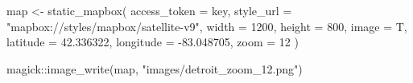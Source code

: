 \documentclass[
  letterpaper,
  DIV=11,
  numbers=noendperiod]{scrreprt}
\newenvironment{Shaded}{\begin{snugshade}}{\end{snugshade}}
\newcommand{\AttributeTok}[1]{\textcolor[rgb]{0.40,0.45,0.13}{#1}}
\newcommand{\DecValTok}[1]{\textcolor[rgb]{0.68,0.00,0.00}{#1}}
\newcommand{\FloatTok}[1]{\textcolor[rgb]{0.68,0.00,0.00}{#1}}
\newcommand{\FunctionTok}[1]{\textcolor[rgb]{0.28,0.35,0.67}{#1}}
\newcommand{\NormalTok}[1]{\textcolor[rgb]{0.00,0.23,0.31}{#1}}
\newcommand{\OtherTok}[1]{\textcolor[rgb]{0.00,0.23,0.31}{#1}}
\newcommand{\SpecialCharTok}[1]{\textcolor[rgb]{0.37,0.37,0.37}{#1}}
\newcommand{\StringTok}[1]{\textcolor[rgb]{0.13,0.47,0.30}{#1}}
\begin{document}
\begin{Shaded}
\begin{Highlighting}[]
\NormalTok{map }\OtherTok{\textless{}{-}} \FunctionTok{static\_mapbox}\NormalTok{(}
  \AttributeTok{access\_token =}\NormalTok{ key,}
  \AttributeTok{style\_url =} \StringTok{"mapbox://styles/mapbox/satellite{-}v9"}\NormalTok{,}
  \AttributeTok{width =} \DecValTok{1200}\NormalTok{,}
  \AttributeTok{height =} \DecValTok{800}\NormalTok{, }
  \AttributeTok{image =}\NormalTok{ T, }
  \AttributeTok{latitude =} \FloatTok{42.336322}\NormalTok{,}
  \AttributeTok{longitude =} \SpecialCharTok{{-}}\FloatTok{83.048705}\NormalTok{, }\AttributeTok{zoom =} \DecValTok{12}
\NormalTok{)}

\NormalTok{magick}\SpecialCharTok{::}\FunctionTok{image\_write}\NormalTok{(map, }\StringTok{"images/detroit\_zoom\_12.png"}\NormalTok{)}
\end{Highlighting}
\end{Shaded}
\end{document}
